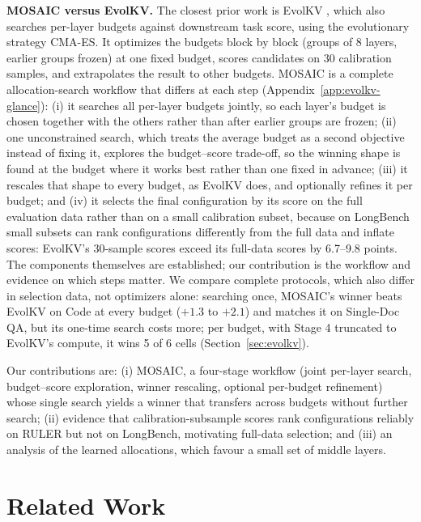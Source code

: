 \documentclass[11pt]{article}
\begin{document}
\textbf{MOSAIC versus EvolKV.}\label{sec:intro-evolkv} The closest prior work is EvolKV \citep{yu2025evolkv}, which also searches per-layer budgets against downstream task score, using the evolutionary strategy CMA-ES. It optimizes the budgets block by block (groups of 8 layers, earlier groups frozen) at one fixed budget, scores candidates on 30 calibration samples, and extrapolates the result to other budgets. MOSAIC is a complete allocation-search workflow that differs at each step (Appendix~\ref{app:evolkv-glance}): (i) it searches all per-layer budgets jointly, so each layer's budget is chosen together with the others rather than after earlier groups are frozen; (ii) one unconstrained search, which treats the average budget as a second objective instead of fixing it, explores the budget--score trade-off, so the winning shape is found at the budget where it works best rather than one fixed in advance; (iii) it rescales that shape to every budget, as EvolKV does, and optionally refines it per budget; and (iv) it selects the final configuration by its score on the full evaluation data rather than on a small calibration subset, because on LongBench small subsets can rank configurations differently from the full data and inflate scores: EvolKV's 30-sample scores exceed its full-data scores by 6.7--9.8 points. The components themselves are established; our contribution is the workflow and evidence on which steps matter. We compare complete protocols, which also differ in selection data, not optimizers alone: searching once, MOSAIC's winner beats EvolKV on Code at every budget ($+1.3$ to $+2.1$) and matches it on Single-Doc QA, but its one-time search costs more; per budget, with Stage 4 truncated to EvolKV's compute, it wins 5 of 6 cells (Section~\ref{sec:evolkv}).

Our contributions are: (i) MOSAIC, a four-stage workflow (joint per-layer search, budget--score exploration, winner rescaling, optional per-budget refinement) whose single search yields a winner that transfers across budgets without further search; (ii) evidence that calibration-subsample scores rank configurations reliably on RULER but not on LongBench, motivating full-data selection; and (iii) an analysis of the learned allocations, which favour a small set of middle layers.

\section{Related Work}
\end{document}
